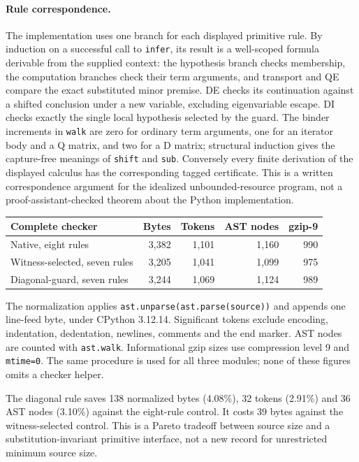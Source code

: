 \documentclass[11pt]{article}
\theoremstyle{definition}
\theoremstyle{remark}
\begin{document}
\paragraph{Rule correspondence.}
The implementation uses one branch for each displayed primitive rule.
By induction on a successful call to \texttt{infer}, its result is a
well-scoped formula derivable from the supplied context: the hypothesis
branch checks membership, the computation branches check their term
arguments, and transport and QE compare the exact substituted minor
premise. DE checks its continuation against a shifted conclusion under a
new variable, excluding eigenvariable escape. DI checks exactly the
single local hypothesis selected by the guard. The binder increments in
\texttt{walk} are zero for ordinary term arguments, one for an iterator
body and a Q matrix, and two for a D matrix; structural induction gives
the capture-free meanings of \texttt{shift} and \texttt{sub}.
Conversely every finite derivation of the displayed calculus has the
corresponding tagged certificate. This is a written correspondence
argument for the idealized unbounded-resource program, not a
proof-assistant-checked theorem about the Python implementation.

\begin{center}\small
\begin{tabular}{@{}lrrrr@{}}
\toprule
Complete checker & Bytes & Tokens & AST nodes & gzip-9\\
\midrule
Native, eight rules & 3,382 & 1,101 & 1,160 & 990 \\
Witness-selected, seven rules & 3,205 & 1,041 & 1,099 & 975 \\
Diagonal-guard, seven rules & 3,244 & 1,069 & 1,124 & 989 \\
\bottomrule
\end{tabular}\end{center}

The normalization applies \texttt{ast.unparse(ast.parse(source))} and
appends one line-feed byte, under CPython 3.12.14. Significant tokens exclude encoding, indentation,
dedentation, newlines, comments and the end marker. AST nodes are counted
with \texttt{ast.walk}. Informational gzip sizes use compression level 9
and \texttt{mtime=0}. The same procedure is used for all three modules;
none of these figures omits a checker helper.

The diagonal rule saves 138 normalized bytes (4.08\%), 32 tokens
(2.91\%) and 36 AST nodes (3.10\%) against the eight-rule control.
It costs 39 bytes against the witness-selected control. This is a
Pareto tradeoff between source size and a substitution-invariant primitive
interface, not a new record for unrestricted minimum source size.
\end{document}
